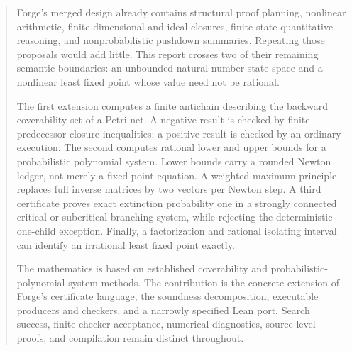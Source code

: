 \documentclass[11pt,a4paper]{article}
\theoremstyle{definition}\newtheorem{definition}[theorem]{Definition}
\theoremstyle{remark}\newtheorem{remark}[theorem]{Remark}
\begin{document}
\begin{abstract}
Forge's merged design already contains structural proof planning, nonlinear arithmetic, finite-dimensional and ideal closures, finite-state quantitative reasoning, and nonprobabilistic pushdown summaries. Repeating those proposals would add little. This report crosses two of their remaining semantic boundaries: an unbounded natural-number state space and a nonlinear least fixed point whose value need not be rational.

The first extension computes a finite antichain describing the backward coverability set of a Petri net. A negative result is checked by finite predecessor-closure inequalities; a positive result is checked by an ordinary execution. The second computes rational lower and upper bounds for a probabilistic polynomial system. Lower bounds carry a rounded Newton ledger, not merely a fixed-point equation. A weighted maximum principle replaces full inverse matrices by two vectors per Newton step. A third certificate proves exact extinction probability one in a strongly connected critical or subcritical branching system, while rejecting the deterministic one-child exception. Finally, a factorization and rational isolating interval can identify an irrational least fixed point exactly.

The mathematics is based on established coverability and probabilistic-polynomial-system methods. The contribution is the concrete extension of Forge's certificate language, the soundness decomposition, executable producers and checkers, and a narrowly specified Lean port. Search success, finite-checker acceptance, numerical diagnostics, source-level proofs, and compilation remain distinct throughout.
\end{abstract}
\begingroup
\small
\setlength{\parskip}{0pt}
\tableofcontents
\endgroup
\newpage
{}








\appendix



\end{document}

